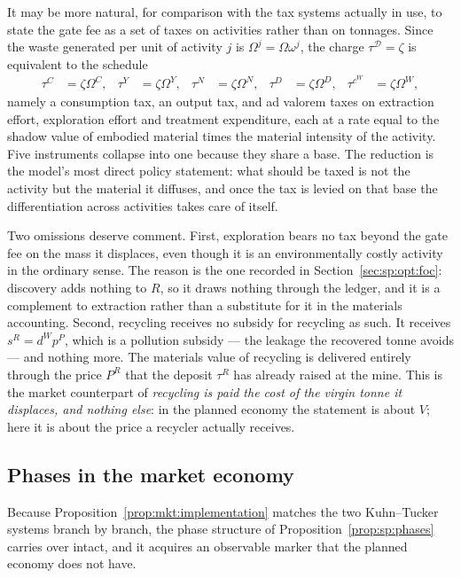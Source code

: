  It may be more natural, for comparison with the tax systems
actually in use, to state the gate fee as a set of taxes on activities rather than on tonnages. Since
the waste generated per unit of activity $j$ is $\Omega^j=\Omega\omega^j$, the charge
$\tau^{\mathcal D}=\zeta$ is equivalent to the schedule
\begin{align}
\tau^C &= \zeta\Omega^C,
&
\tau^Y &= \zeta\Omega^Y,
&
\tau^N &= \zeta\Omega^N,
&
\tau^D &= \zeta\Omega^D,
&
\tau^{c^W} &= \zeta\Omega^W,
\label{eq:mkt:ad-valorem}
\end{align}
namely a consumption tax, an output tax, and ad valorem taxes on extraction effort, exploration effort
and treatment expenditure, each at a rate equal to the shadow value of embodied material times the
material intensity of the activity. Five instruments collapse into one because they share a base. The
reduction is the model's most direct policy statement: what should be taxed is not the activity but
the material it diffuses, and once the tax is levied on that base the differentiation across
activities takes care of itself.

 Two omissions deserve comment. First, exploration bears no
tax beyond the gate fee on the mass it displaces, even though it is an environmentally costly activity
in the ordinary sense. The reason is the one recorded in Section~\ref{sec:sp:opt:foc}: discovery adds
nothing to $R$, so it draws nothing through the ledger, and it is a complement to extraction rather
than a substitute for it in the materials accounting. Second, recycling receives no subsidy for
recycling as such. It receives $s^R=d^Wp^P$, which is a pollution subsidy --- the leakage the recovered
tonne avoids --- and nothing more. The materials value of recycling is delivered entirely through the
price $P^R$ that the deposit $\tau^R$ has already raised at the mine. This is the market counterpart of
\emph{recycling is paid the cost of the virgin tonne it displaces, and nothing else}: in the planned
economy the statement is about $V$; here it is about the price a recycler actually receives.

\subsection{Phases in the market economy}\label{sec:mkt:implementation:phases}

Because Proposition~\ref{prop:mkt:implementation} matches the two Kuhn--Tucker systems branch by
branch, the phase structure of Proposition~\ref{prop:sp:phases} carries over intact, and it acquires an
observable marker that the planned economy does not have.

